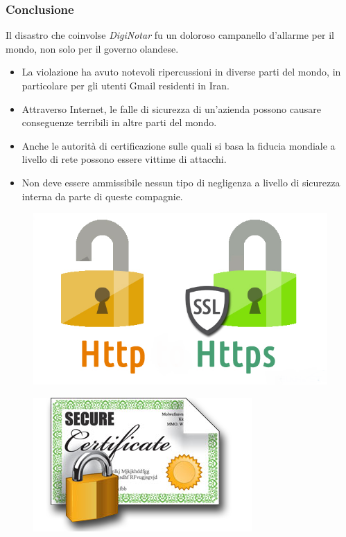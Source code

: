 \documentclass{beamer}
\begin{document}
\begin{frame}
\frametitle{Conclusione}
Il disastro che coinvolse \alert{\textit{DigiNotar}} fu un doloroso campanello d'\alert{allarme per il mondo}, non solo per il governo olandese.
\begin{itemize}
	\item La violazione ha avuto notevoli \alert{ripercussioni} in diverse parti del mondo, in particolare per gli \alert{utenti Gmail} residenti in \alert{Iran}.
	\item Attraverso Internet, le \alert{falle di sicurezza} di un'azienda possono causare \alert{conseguenze terribili} in altre parti del mondo.
	\item Anche le \alert{autorità di certificazione} sulle quali si basa la fiducia mondiale a livello di rete possono essere \alert{vittime di attacchi}.
	\item Non deve essere ammissibile \alert{nessun tipo di negligenza} a livello di sicurezza interna da parte di queste compagnie.
\end{itemize}
\begin{multicols}{2}
\begin{figure}[H]
	\centering
	\includegraphics[scale=0.25]{https}
\end{figure}
\columnbreak
\begin{figure}[H]
	\centering
	\includegraphics[scale=0.35]{secure}
\end{figure}
\end{multicols}
\end{frame}
\end{document}
